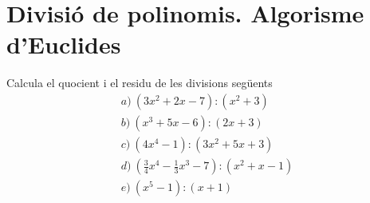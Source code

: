 \section{Divisió de polinomis. Algorisme d’Euclides}

\begin{exercici}
Calcula el quocient i el residu de les divisions següents\[
\begin{array}{l}
a)~(3x^{2}+2x-7):(x^{2}+3) \\
b)~(x^{3}+5x-6):(2x+3) \\
c)~(4x^{4}-1):(3x^{2}+5x+3) \\
d)~\left( \frac{3}{4}x^{4}-\frac{1}{3}x^{3}-7\right):(x^{2}+x-1) \\
e)~(x^{5}-1):(x+1)\end{array}\]
\end{exercici}


